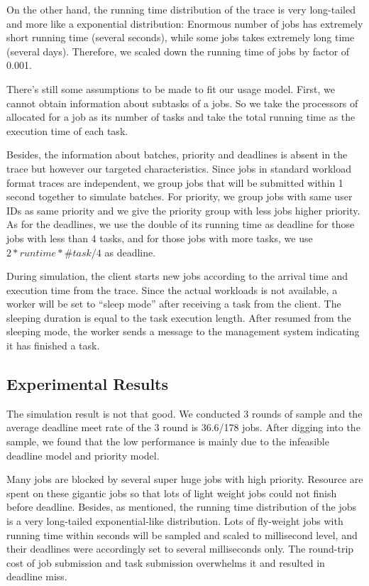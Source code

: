 On the other hand, the running time distribution of the trace is very
long-tailed and more like a exponential distribution: Enormous number of
jobs has extremely short running time (several seconds), while some jobs
takes extremely long time (several days).
Therefore, we scaled down the running time of jobs by factor of 0.001.

There's still some assumptions to be made to fit our usage model.
First, we cannot obtain information about subtasks of a jobs.
So we take the processors of allocated for a job as its number of tasks
and take the total running time as the execution time of each task.

Besides, the information about batches, priority and deadlines is absent
in the trace but however our targeted characteristics.
Since jobs in standard workload format traces are independent,
we group jobs that will be submitted within 1 second together to
simulate batches.
For priority, we group jobs with same user IDs as same priority and we
give the priority group with less jobs higher priority.
As for the deadlines, we use the double of its running time as deadline
for those jobs with less than 4 tasks, and for those jobs with more
tasks, we use $2 * runtime * \#task / 4$ as deadline.

During simulation, the client starts new jobs according to the arrival
time and execution time from the trace.
Since the actual workloads is not available, a worker will be set to
``sleep mode'' after receiving a task from the client.
The sleeping duration is equal to the task execution length.
After resumed from the sleeping mode, the worker sends a message to the
management system indicating it has finished a task.

\subsection{Experimental Results}

The simulation result is not that good. We conducted 3 rounds of sample
and the average deadline meet rate of the 3 round is 36.6/178 jobs.
After digging into the sample, we found that the low performance is
mainly due to the infeasible deadline model and priority model.

Many jobs are blocked by several super huge jobs with high priority.
Resource are spent on these gigantic jobs so that lots of light weight
jobs could not finish before deadline.
Besides, as mentioned, the running time distribution of the jobs is a
very long-tailed exponential-like distribution.
Lots of fly-weight jobs with running time within seconds will be sampled
and scaled to millisecond level, and their deadlines were accordingly
set to several milliseconds only.
The round-trip cost of job submission and task submission overwhelms it
and resulted in deadline miss.


